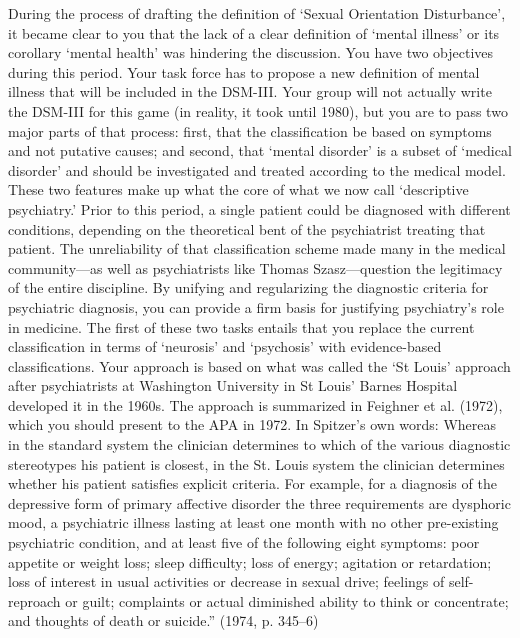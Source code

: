 During the process of drafting the definition of `Sexual Orientation Disturbance', it became clear to you that the lack of a clear definition of `mental illness' or its corollary `mental health' was hindering the discussion.
You have two objectives during this period. Your task force has to propose a new definition of mental illness that will be included in the DSM-III. Your group will not actually write the DSM-III for this game (in reality, it took until 1980), but you are to pass two major parts of that process: first, that the classification be based on symptoms and not putative causes; and second, that `mental disorder' is a subset of `medical disorder' and should be investigated and treated according to the medical model. These two features make up what the core of what we now call `descriptive psychiatry.' Prior to this period, a single patient could be diagnosed with different conditions, depending on the theoretical bent of the psychiatrist treating that patient. The unreliability of that classification scheme made many in the medical community—as well as psychiatrists like Thomas Szasz—question the legitimacy of the entire discipline. By unifying and regularizing the diagnostic criteria for psychiatric diagnosis, you can provide a firm basis for justifying psychiatry's role in medicine.
The first of these two tasks entails that you replace the current classification in terms of `neurosis' and `psychosis' with evidence-based classifications. Your approach is based on what was called the `St Louis' approach after psychiatrists at Washington University in St Louis' Barnes Hospital developed it in the 1960s. The approach is summarized in Feighner et al. (1972), which you should present to the APA in 1972.
In Spitzer's own words:
Whereas in the standard system the clinician determines to which of the various diagnostic stereotypes his patient is closest, in the St. Louis system the clinician determines whether his patient satisfies explicit criteria. For example, for a diagnosis of the depressive form of primary affective disorder the three requirements are dysphoric mood, a psychiatric illness lasting at least one month with no other pre-existing psychiatric condition, and at least five of the following eight symptoms: poor appetite or weight loss; sleep difficulty; loss of energy; agitation or retardation; loss of interest in usual activities or decrease in sexual drive; feelings of self-reproach or guilt; complaints or actual diminished ability to think or concentrate; and thoughts of death or suicide.” (1974, p. 345--6)

